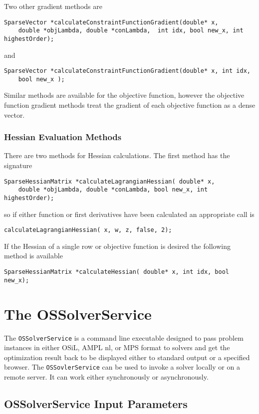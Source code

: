 \documentclass[11pt]{article}
\renewcommand{\_}{{\char"5F}}
\renewcommand{\{}{{\char"7B}}
\renewcommand{\}}{{\char"7D}}
\renewcommand{\^}{{\char"0D}}
\renewcommand{\'}{{\char"0D}}
\begin{document}
Two other gradient methods are
\begin{verbatim}
SparseVector *calculateConstraintFunctionGradient(double* x, 
    double *objLambda, double *conLambda,  int idx, bool new_x, int highestOrder);
\end{verbatim}
and
\begin{verbatim}
SparseVector *calculateConstraintFunctionGradient(double* x, int idx, 
    bool new_x );
\end{verbatim}

Similar methods are available for the objective function, however the objective function gradient methods treat the gradient of each objective function as a dense vector. 


\subsubsection{Hessian Evaluation Methods}

There are two methods for Hessian calculations.  The first method has the signature
\begin{verbatim}
SparseHessianMatrix *calculateLagrangianHessian( double* x, 
    double *objLambda, double *conLambda, bool new_x, int highestOrder);
\end{verbatim}
so if either function or first derivatives have been calculated an appropriate call is
\begin{verbatim}
calculateLagrangianHessian( x, w, z, false, 2);
\end{verbatim}
If the Hessian of a single row or objective function is desired the following method is available
\begin{verbatim}
SparseHessianMatrix *calculateHessian( double* x, int idx, bool new_x);
\end{verbatim}

\section{The OSSolverService}\label{section:ossolverservice}

The {\tt OSSolverService} is a command line executable designed to pass problem instances in either  OSiL, AMPL nl, or MPS format  to solvers and get the optimization result back to be displayed either to standard output or a specified browser.  The {\tt OSSovlerService} can be used to invoke a solver locally or on a remote server. It can work either synchronously or asynchronously. 

\subsection{OSSolverService Input Parameters}
\end{document}
